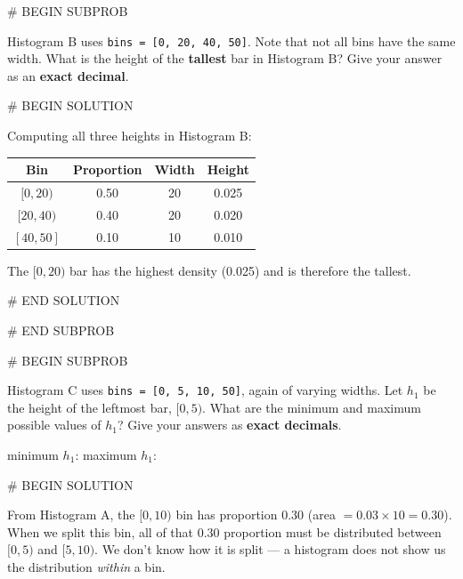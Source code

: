 \documentclass[twoside,12pt]{article}
\begin{document}
{# BEGIN SUBPROB


Histogram B uses \texttt{bins = [0, 20, 40, 50]}. Note that not all bins have the same width. What is the height of the \textbf{tallest} bar in Histogram B? Give your answer as an \textbf{exact decimal}.

\smallskip
\begin{center}
\end{center}

# BEGIN SOLUTION



\smallskip
Computing all three heights in Histogram B:

\smallskip
\begin{center}
\begin{tabular}{cccc}
\toprule
Bin & Proportion & Width & Height \\
\midrule
$[0, 20)$  & 0.50 & 20 & 0.025 \\
$[20, 40)$ & 0.40 & 20 & 0.020 \\
$[40, 50]$ & 0.10 & 10 & 0.010 \\
\bottomrule
\end{tabular}
\end{center}

\smallskip
The $[0, 20)$ bar has the highest density (0.025) and is therefore the tallest.


# END SOLUTION



# END SUBPROB

\bigskip

# BEGIN SUBPROB


Histogram C uses \texttt{bins = [0, 5, 10, 50]}, again of varying widths. Let $h_1$ be the height of the leftmost bar, $[0, 5)$. What are the minimum and maximum possible values of $h_1$? Give your answers as \textbf{exact decimals}.

\smallskip
\begin{center}
    minimum $h_1$: 
\qquad
maximum $h_1$: 
\end{center}


# BEGIN SOLUTION



From Histogram A, the $[0, 10)$ bin has proportion 0.30 (area $= 0.03 \times 10 = 0.30$). When we split this bin, all of that 0.30 proportion must be distributed between $[0, 5)$ and $[5, 10)$. We don't know how it is split --- a histogram does not show us the distribution \textit{within} a bin.

}
\end{document}
